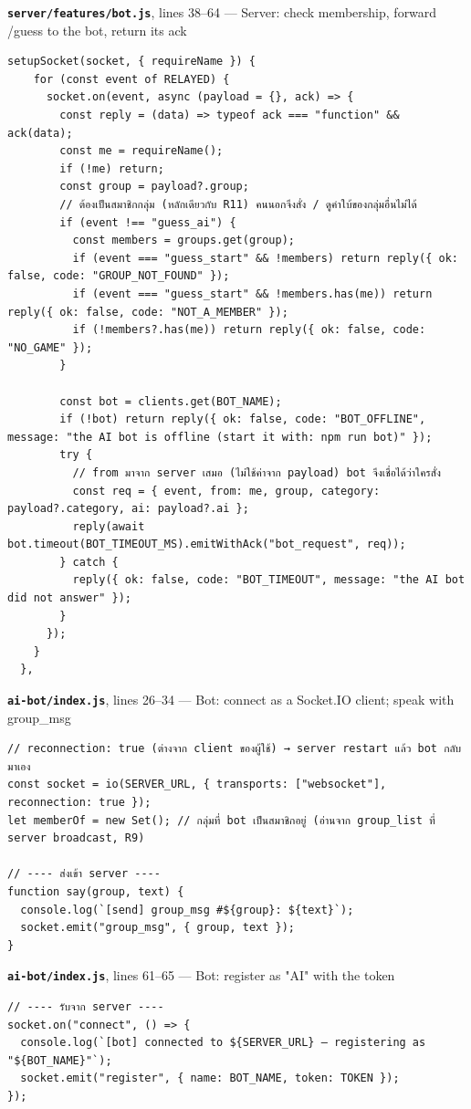 \documentclass[11pt,a4paper]{article}
\newcommand{\code}[1]{\texttt{#1}}
\newcommand{\snap}[3]{\par\medskip\textbf{\code{#1}}, lines #2 --- #3}
\begin{document}
\snap{server/features/bot.js}{38--64}{Server: check membership, forward /guess to the bot, return its ack}
\begin{Verbatim}[firstnumber=38]
  setupSocket(socket, { requireName }) {
    for (const event of RELAYED) {
      socket.on(event, async (payload = {}, ack) => {
        const reply = (data) => typeof ack === "function" && ack(data);
        const me = requireName();
        if (!me) return;
        const group = payload?.group;
        // ต้องเป็นสมาชิกกลุ่ม (หลักเดียวกับ R11) คนนอกจึงสั่ง / ดูคำใบ้ของกลุ่มอื่นไม่ได้
        if (event !== "guess_ai") {
          const members = groups.get(group);
          if (event === "guess_start" && !members) return reply({ ok: false, code: "GROUP_NOT_FOUND" });
          if (event === "guess_start" && !members.has(me)) return reply({ ok: false, code: "NOT_A_MEMBER" });
          if (!members?.has(me)) return reply({ ok: false, code: "NO_GAME" });
        }

        const bot = clients.get(BOT_NAME);
        if (!bot) return reply({ ok: false, code: "BOT_OFFLINE", message: "the AI bot is offline (start it with: npm run bot)" });
        try {
          // from มาจาก server เสมอ (ไม่ใช้ค่าจาก payload) bot จึงเชื่อได้ว่าใครสั่ง
          const req = { event, from: me, group, category: payload?.category, ai: payload?.ai };
          reply(await bot.timeout(BOT_TIMEOUT_MS).emitWithAck("bot_request", req));
        } catch {
          reply({ ok: false, code: "BOT_TIMEOUT", message: "the AI bot did not answer" });
        }
      });
    }
  },
\end{Verbatim}

\snap{ai-bot/index.js}{26--34}{Bot: connect as a Socket.IO client; speak with group\_msg}
\begin{Verbatim}[firstnumber=26]
// reconnection: true (ต่างจาก client ของผู้ใช้) → server restart แล้ว bot กลับมาเอง
const socket = io(SERVER_URL, { transports: ["websocket"], reconnection: true });
let memberOf = new Set(); // กลุ่มที่ bot เป็นสมาชิกอยู่ (อ่านจาก group_list ที่ server broadcast, R9)

// ---- ส่งเข้า server ----
function say(group, text) {
  console.log(`[send] group_msg #${group}: ${text}`);
  socket.emit("group_msg", { group, text });
}
\end{Verbatim}

\snap{ai-bot/index.js}{61--65}{Bot: register as "AI" with the token}
\begin{Verbatim}[firstnumber=61]
// ---- รับจาก server ----
socket.on("connect", () => {
  console.log(`[bot] connected to ${SERVER_URL} — registering as "${BOT_NAME}"`);
  socket.emit("register", { name: BOT_NAME, token: TOKEN });
});
\end{Verbatim}
\end{document}
